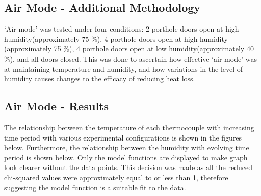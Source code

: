 \documentclass{article}
\begin{document}
\subsection{Air Mode - Additional Methodology}
\vspace{3mm}
‘Air mode’ was  tested under four conditions: 2 porthole doors open at high humidity(approximately 75 \%), 4 porthole doors open at high humidity (approximately 75 \%), 4 porthole doors open at low humidity(approximately 40 \%), and all doors closed. This was done to ascertain how effective ‘air mode’ was at maintaining temperature and humidity, and how variations in the level of humidity causes changes to the efficacy of reducing heat loss. 
\
\subsection{Air Mode - Results} \label{AirModeResults}
\vspace{3mm}
The relationship between the temperature of each thermocouple with increasing time period with various experimental configurations is shown in the figures below. Furthermore, the relationship between the humidity with evolving time period is shown below. Only the model functions are displayed to make graph look clearer without the data points. This decision was made as all the reduced chi-squared values were approximately equal to or less than 1, therefore suggesting the model function is a suitable fit to the data. 
\end{document}
